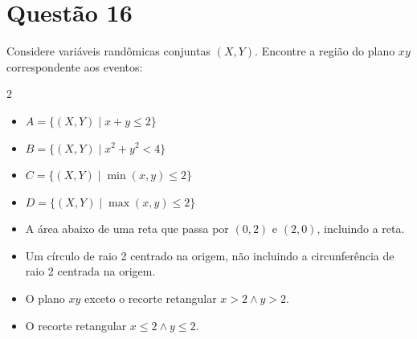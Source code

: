 \section{Questão 16}
Considere variáveis randômicas conjuntas $(X, Y)$.
Encontre a região do plano $xy$ correspondente aos eventos:
%
\begin{multicols}{2}
\begin{itemize}
    \item [a)] $A = \{(X,Y)\mid x + y \leq 2\}$
    \item [b)] $B = \{(X,Y)\mid x^2 + y^2 < 4\}$
    \item [c)] $C = \{(X,Y)\mid \min(x, y) \leq 2\}$
    \item [d)] $D = \{(X,Y)\mid \max(x, y) \leq 2\}$
\end{itemize}
\end{multicols}

\begin{respostas}
\begin{itemize}
    \item [a)] 
    A área abaixo de uma reta que passa por $(0, 2)$ e $(2, 0)$, incluindo a reta.
    
    \item [b)] 
    Um círculo de raio 2 centrado na origem, não incluindo a circunferência de raio 2 centrada na origem.
    
    \item [c)] 
    O plano $xy$ exceto o recorte retangular $x>2 \wedge y>2$.
    
    \item [d)] 
    O recorte retangular $x\leq 2 \wedge y\leq 2$.
\end{itemize}
\end{respostas}